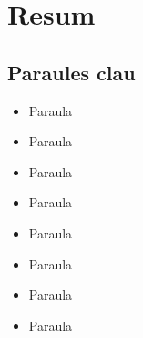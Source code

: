 \chapter*{Resum}\label{ch:abstract-ca}

\lipsum[1-3]

\section*{Paraules clau}\label{sec:keywords-ca}
\begin{multicols}{2}
    \begin{itemize}
        \item Paraula
        \item Paraula
        \item Paraula
        \item Paraula
    \end{itemize}
    \columnbreak
    \begin{itemize}
        \item Paraula
        \item Paraula
        \item Paraula
        \item Paraula
    \end{itemize}
\end{multicols}